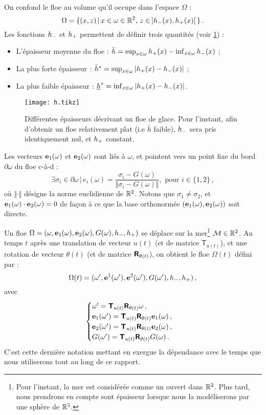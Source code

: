 \noindent On confond le floe au volume qu'il occupe dans l'espace $\Omega$ :
\[
    \Omega = \{(x,z) \,|\, x \in \omega \in \mathbb{R}^2, \, z \in \,]h_{-}(x), h_{+}(x)[ \, \} \,.
\] 
Les fonctions $h_{-}$ et $h_{+}$ permettent de définir trois quantités (voir \cref{fig:h}) :
\begin{itemize}
    \item L'épaisseur moyenne du floe : $\bar{h} =  \sup_{x\in\omega}{h_{+}(x)} - \inf_{x\in\omega}{h_{-}(x)}$ ;
    \item La plus forte épaisseur : $\bar{h}^* = \sup_{x\in\omega}{ \vert h_{+}(x) - h_{-}(x) \vert}$ ;
    \item La plus faible épaisseur : $\underline{h}^* = \inf_{x\in\omega}{ \vert h_{+}(x) - h_{-}(x) \vert}$. 
\end{itemize}

\begin{figure}[!h]
    \centering
    \texttt{[image: h.tikz]}
    \caption{Différentes épaisseurs décrivant un floe de glace. Pour l'instant, afin d'obtenir un floe relativement plat (i.e $\bar{h}$ faible), $h_{-}$ sera pris identiquement nul, et $h_{+}$ constant.}
    \label{fig:h}
\end{figure}

\noindent Les vecteurs $\bm{\mathrm{e}}_1(\omega)$ et $\bm{\mathrm{e}}_2(\omega)$ sont liés à $\omega$, et pointent vers un point fixe du bord $\partial \omega$ du floe c-à-d :
\[
    \exists \sigma_i \in \partial \omega \, | \, e_i(\omega) = \frac{\sigma_i - G(\omega)}{\Vert \sigma_i - G(\omega) \Vert}, \text{ pour } i \in \{1,2\} \,,
\]
où $\Vert \cdot \Vert$ désigne la norme euclidienne de $\mathbb{R}^2$. Notons que $\sigma_1 \neq \sigma_2$, et $\bm{\mathrm{e}}_1(\omega) \cdot \bm{\mathrm{e}}_2(\omega) = 0$ de façon à ce que la base orthonormée $(\bm{\mathrm{e}}_1(\omega), \bm{\mathrm{e}}_2(\omega))$ soit directe.

Un floe $\Omega = (\omega, \bm{\mathrm{e}}_1(\omega), \bm{\mathrm{e}}_2(\omega), G(\omega), h_{-}, h_{+})$ se déplace sur la mer\footnote{Pour l'instant, la mer est considérée comme un ouvert dans $\mathbb{R}^2$. Plus tard, nous prendrons en compte sont épaisseur lorsque nous la modéliserons par une sphère de $\mathbb{R}^3$.} $\mathcal{M} \in \mathbb{R}^2$. Au temps $t$ après une translation de vecteur $u(t)$ (et de matrice $\mathsf{T}_{u(t)}$), et une rotation de vecteur $\theta(t)$ (et de matrice $\bm{\mathsf{R}}_{\theta(t)}$), on obtient le floe $\Omega (t)$ défini par :
\[
    \Omega (t) = (\omega^\prime, \bm{\mathrm{e}}^1(\omega^\prime), \bm{\mathrm{e}}^2(\omega^\prime), G(\omega^\prime), h_{-}, h_{+}) \,,
\]
avec
$$ 
\begin{cases}
    \omega^\prime = \bm{\mathsf{T}}_{u(t)} \bm{\mathsf{R}}_{\theta(t)} \omega \,, \\
    \bm{\mathrm{e}}_1(\omega^\prime) = \bm{\mathsf{T}}_{u(t)} \bm{\mathsf{R}}_{\theta(t)} \bm{\mathrm{e}}_1(\omega) \,, \\
    \bm{\mathrm{e}}_2(\omega^\prime) = \bm{\mathsf{T}}_{u(t)} \bm{\mathsf{R}}_{\theta(t)} \bm{\mathrm{e}}_2(\omega) \,, \\
    G(\omega^\prime) = \bm{\mathsf{T}}_{u(t)} \bm{\mathsf{R}}_{\theta(t)} G(\omega) \,.
\end{cases}
$$
C'est cette dernière notation mettant en exergue la dépendance avec le temps que nous utiliserons tout au long de ce rapport.

